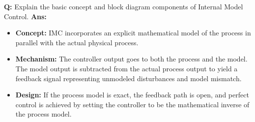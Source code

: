 \documentclass[10pt,a4paper,twocolumn]{article}
\begin{document}
\begin{tcolorbox}[
  colback=white,
  colframe=UnitColorFour,
  colbacktitle=gray!10!white,
  coltitle=black,
  fonttitle=\bfseries\sffamily\small,
  title={Unit IV $\bullet$ Card 9: Internal Model Control (IMC)},
  boxrule=1.2pt,
  arc=2mm,
  outer arc=2mm,
  boxsep=1.5mm,
  top=1mm,
  bottom=1mm,
  left=1.5mm,
  right=1.5mm,
  before skip=2.5mm,
  after skip=2.5mm
]
\textbf{Q:} Explain the basic concept and block diagram components of Internal Model Control.
\tcbline
\textbf{Ans:} \begin{itemize}
  \item   \textbf{Concept:} IMC incorporates an explicit mathematical model of the process in parallel with the actual physical process.
  \item   \textbf{Mechanism:} The controller output goes to both the process and the model. The model output is subtracted from the actual process output to yield a feedback signal representing unmodeled disturbances and model mismatch.
  \item   \textbf{Design:} If the process model is exact, the feedback path is open, and perfect control is achieved by setting the controller to be the mathematical inverse of the process model.
\end{itemize}
\end{tcolorbox}
\end{document}
